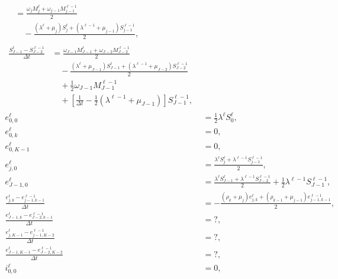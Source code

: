 \documentclass{jpmarticle}
\let\subequationsorig\subequations%
\let\endsubequationsorig\endsubequations%
\renewenvironment{subequations}{
  \subequationsorig
  \renewcommand{\theequation}{\theparentequation.\arabic{equation}}
}{
  \endsubequationsorig
}
\begin{document}
\begin{subequations}
\begin{align}
\begin{split}
      &=
      \frac{\omega_j M_j^{\ell}
        + \omega_{j - 1} M_{j - 1}^{\ell - 1}}
      {2}
      \\ & \quad {}
      - \frac{(\lambda^{\ell} + \mu_j) S_j^{\ell}
        + (\lambda^{\ell - 1} + \mu_{j - 1}) S_{j - 1}^{\ell - 1}}
      {2},
    \end{split}
    \\
    \begin{split}
      \frac{S_{J - 1}^{\ell} - S_{J - 2}^{\ell - 1}}{\Delta t}
      &=
      \frac{\omega_{J - 1} M_{J - 1}^{\ell}
        + \omega_{J - 2} M_{J - 2}^{\ell - 1}}
      {2}
      \\ & \quad {}
      - \frac{(\lambda^{\ell} + \mu_{J - 1}) S_{J - 1}^{\ell}
        + (\lambda^{\ell - 1} + \mu_{J - 2}) S_{J - 2}^{\ell - 1}}
      {2}
      \\ & \quad {}
      + \frac{1}{2} \omega_{J - 1} M_{J - 1}^{\ell - 1}
      \\ & \quad {}
      + \left[\frac{1}{\Delta t}
        - \frac{1}{2} (\lambda^{\ell - 1} + \mu_{J - 1})\right]
      S_{J - 1}^{\ell - 1},
    \end{split}
    \\
    e_{0, 0}^{\ell}
    &=
    \frac{1}{2} \lambda^{\ell} S_0^{\ell},
    \\
    e_{0, k}^{\ell}
    &= 0,
    \\
    e_{0, K - 1}^{\ell}
    &= 0,
    \\
    e_{j, 0}^{\ell}
    &=
    \frac{\lambda^{\ell} S_j^{\ell}
      + \lambda^{\ell - 1} S_{j - 1}^{\ell - 1}}
    {2},
    \\
    e_{J - 1, 0}^{\ell}
    &=
    \frac{\lambda^{\ell} S_{J - 1}^{\ell}
      + \lambda^{\ell - 1} S_{J - 2}^{\ell - 1}}
    {2}
    + \frac{1}{2} \lambda^{\ell - 1} S_{J - 1}^{\ell - 1},
    \\
    \frac{e_{j, k}^{\ell} - e_{j - 1, k - 1}^{\ell - 1}}{\Delta t}
    &=
    - \frac{(\rho_k + \mu_j) e_{j, k}^{\ell}
      + (\rho_{k - 1} + \mu_{j - 1}) e_{j - 1, k - 1}^{\ell - 1}}
    {2},
    \\
    \frac{e_{J - 1, k}^{\ell} - e_{J - 2, k - 1}^{\ell - 1}}{\Delta t}
    &= ?,
    \\
    \frac{e_{j, K - 1}^{\ell} - e_{j - 1, K - 2}^{\ell - 1}}{\Delta t}
    &= ?,
    \\
    \frac{e_{J - 1, K - 1}^{\ell} - e_{J - 2, K - 2}^{\ell - 1}}{\Delta t}
    &= ?,
    \\
    i_{0, 0}^{\ell}
    &= 0,
    \\

\end{align}
\end{subequations}
\end{document}
